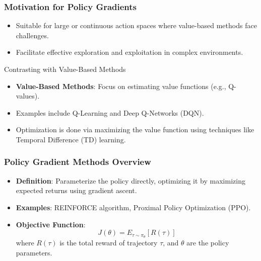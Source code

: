 \documentclass[aspectratio=169]{beamer}
\begin{document}
\begin{frame}[fragile]
    \frametitle{Motivation for Policy Gradients}
    \begin{itemize}
        \item Suitable for large or continuous action spaces where value-based methods face challenges.
        \item Facilitate effective exploration and exploitation in complex environments.
    \end{itemize}
    
    \begin{block}{Contrasting with Value-Based Methods}
        \begin{itemize}
            \item \textbf{Value-Based Methods}: Focus on estimating value functions (e.g., Q-values).
            \item Examples include Q-Learning and Deep Q-Networks (DQN).
            \item Optimization is done via maximizing the value function using techniques like Temporal Difference (TD) learning.
        \end{itemize}
    \end{block}
\end{frame}

\begin{frame}[fragile]
    \frametitle{Policy Gradient Methods Overview}
    \begin{itemize}
        \item \textbf{Definition}: Parameterize the policy directly, optimizing it by maximizing expected returns using gradient ascent.
        \item \textbf{Examples}: REINFORCE algorithm, Proximal Policy Optimization (PPO).
        \item \textbf{Objective Function}:
        \begin{equation}
            J(\theta) = E_{\tau \sim \pi_\theta} [R(\tau)]
        \end{equation}
        where $R(\tau)$ is the total reward of trajectory $\tau$, and $\theta$ are the policy parameters.
    \end{itemize}
\end{frame}
\end{document}
